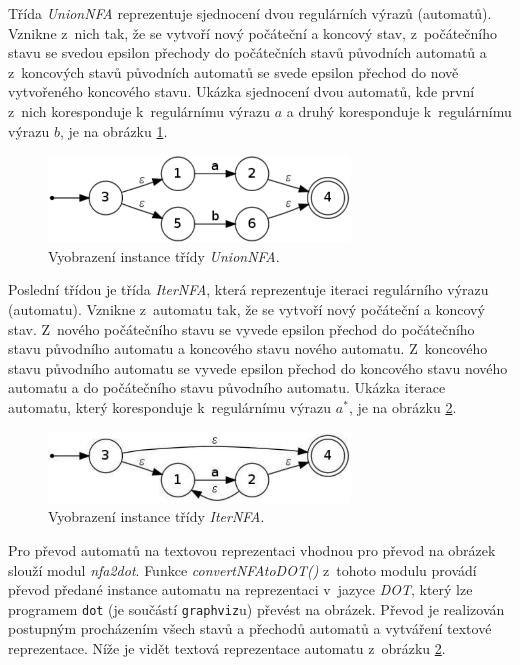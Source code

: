 \documentclass[10pt, notitlepage]{article}
\begin{document}
Třída \emph{UnionNFA} reprezentuje sjednocení dvou regulárních výrazů
(automatů). Vznikne z~nich tak, že se vytvoří nový počáteční a koncový stav,
z~počátečního stavu se svedou epsilon přechody do počátečních stavů původních
automatů a z~koncových stavů původních automatů se svede epsilon přechod do
nově vytvořeného koncového stavu. Ukázka sjednocení dvou automatů, kde první
z~nich koresponduje k~regulárnímu výrazu $a$ a druhý koresponduje
k~regulárnímu výrazu $b$, je na obrázku \ref{fig:UnionNFA}.

\begin{figure}[h]
	\begin{center}
		\includegraphics[width=8cm,keepaspectratio]{include/unionnfa}
	\end{center}
	\caption{Vyobrazení instance třídy \emph{UnionNFA}.}
	\label{fig:UnionNFA}
\end{figure}

Poslední třídou je třída \emph{IterNFA}, která reprezentuje iteraci regulárního
výrazu (automatu). Vznikne z~automatu tak, že se vytvoří nový počáteční a
koncový stav. Z~nového počátečního stavu se vyvede epsilon přechod do
počátečního stavu původního automatu a koncového stavu nového automatu.
Z~koncového stavu původního automatu se vyvede epsilon přechod do koncového
stavu nového automatu a do počátečního stavu původního automatu. Ukázka iterace
automatu, který koresponduje k~regulárnímu výrazu $a^{*}$, je na obrázku
\ref{fig:IterNFA}.

\vspace*{-4cm}
\begin{figure}[h]
	\begin{center}
		\includegraphics[width=8cm,keepaspectratio]{include/iternfa}
	\end{center}
	\caption{Vyobrazení instance třídy \emph{IterNFA}.}
	\label{fig:IterNFA}
\end{figure}

\pagebreak
Pro převod automatů na textovou reprezentaci vhodnou pro převod na obrázek
slouží modul \emph{nfa2dot}. Funkce \emph{convertNFAtoDOT()} z~tohoto
modulu provádí převod předané instance automatu na reprezentaci v~jazyce
\emph{DOT}, který lze programem \texttt{dot} (je součástí \texttt{graphviz}u)
převést na obrázek. Převod je realizován postupným procházením všech stavů a
přechodů automatů a vytváření textové reprezentace. Níže je vidět textová
reprezentace automatu z~obrázku \ref{fig:IterNFA}.
\end{document}
